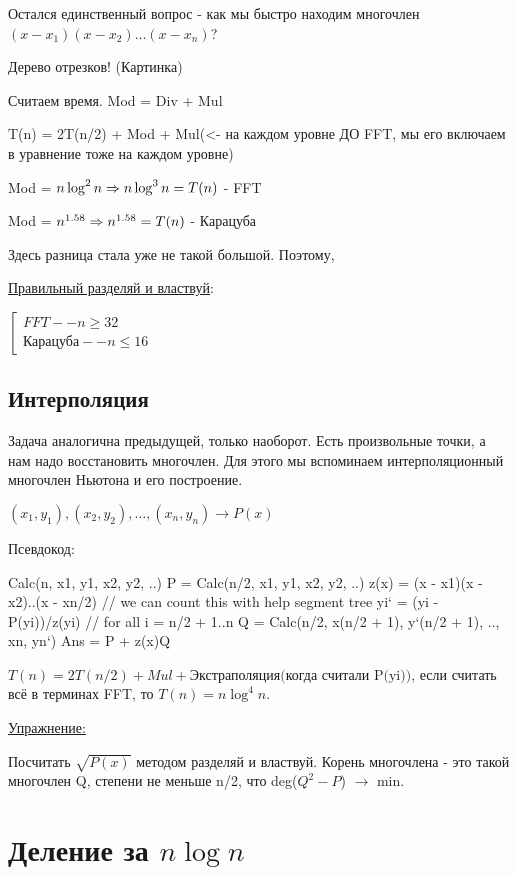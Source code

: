 \begin{enumerate}
Остался единственный вопрос - как мы быстро находим многочлен $(x - x_1)(x - x_2)\dots(x - x_n)$?

Дерево отрезков! (Картинка) 

Считаем время. Mod = Div + Mul

T(n) = 2T(n/2) + Mod + Mul(<- на каждом уровне ДО FFT, мы его включаем в уравнение тоже на каждом уровне)

Mod = $n \log^2 n \Rightarrow n \log^3 n = T(n)$ - FFT

Mod = $n^{1.58} \Rightarrow n^{1.58} = T(n)$ - Карацуба

Здесь разница стала уже не такой большой. Поэтому, 

\underline{Правильный разделяй и властвуй}:

$\left[
    \begin{gathered}
    FFT -- n \ge 32 \\
    \text{Карацуба} -- n \le 16
    \end{gathered}
\right.$

\subsection{Интерполяция}
Задача аналогична предыдущей, только наоборот. Есть произвольные точки, а нам надо восстановить многочлен. Для этого мы вспоминаем интерполяционный многочлен Ньютона и его построение.

$(x_1, y_1), (x_2, y_2), \dots, (x_n, y_n) \rightarrow P(x)$

Псевдокод:

\begin{cppcode}
Calc(n, x1, y1, x2, y2, ..)
    P = Calc(n/2, x1, y1, x2, y2, ..)
    z(x) = (x - x1)(x - x2)..(x - xn/2) // we can count this with help segment tree
    yi` = (yi - P(yi))/z(yi) // for all i = n/2 + 1..n
    Q = Calc(n/2, x(n/2 + 1), y`(n/2 + 1), .., xn, yn`)
    Ans = P + z(x)Q
\end{cppcode}

$T(n) = 2T(n/2) + Mul + \text{Экстраполяция(когда считали P(yi))}$, если считать всё в терминах FFT, то $T(n) = n \log^4 n$.

\underline{Упражнение:}

Посчитать $\sqrt{P(x)}$ методом разделяй и властвуй. Корень многочлена - это такой многочлен Q, степени не меньше n/2, что deg($Q^2 - P$) $\rightarrow$ min.

\section{Деление за \texorpdfstring{$n\log n$}{n log n}}


\end{enumerate}
